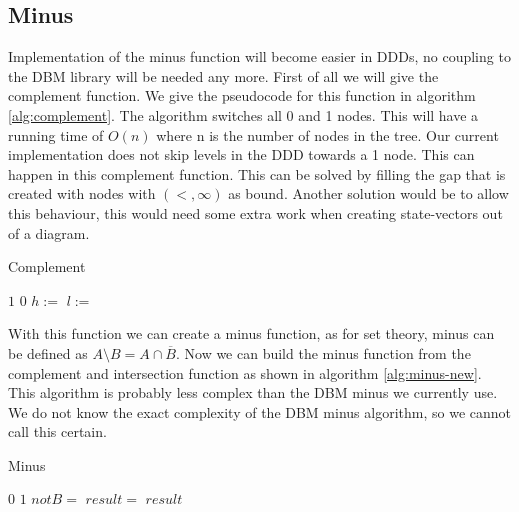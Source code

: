 \subsection{Minus}
Implementation of the minus function will become easier in DDDs, no coupling to the DBM library will be needed any more. First of all we will give the complement function. We give the pseudocode for this function in algorithm \ref{alg:complement}. The algorithm switches all 0 and 1 nodes. This will have a running time of $O(n)$ where n is the number of nodes in the tree. Our current implementation does not skip levels in the DDD towards a 1 node. This can happen in this complement function. This can be solved by filling the gap that is created with nodes with $(<,\infty)$ as bound. Another solution would be to allow this behaviour, this would need some extra work when creating state-vectors out of a diagram.

\begin{algorithm}
\caption{Complement}\label{alg:complement}
\begin{algorithmic}[1]
		\State \Return $1$
	\EndIf
		\State \Return $0$
	\EndIf
	\State $h :=$ 
	\State $l :=$ 
	\State \Return {}
	
\EndProcedure	
\end{algorithmic}
\end{algorithm}

With this function we can create a minus function, as for set theory, minus can be defined as $A \setminus B = A \cap \overline{B}$. Now we can build the minus function from the complement and intersection function as shown in algorithm \ref{alg:minus-new}. This algorithm is probably less complex than the DBM minus we currently use. We do not know the exact complexity of the DBM minus algorithm, so we cannot call this certain. 

\begin{algorithm}
\caption{Minus}\label{alg:minus-new}
\begin{algorithmic}[1]
		\State \Return $0$
	\EndIf
		\State \Return $1$
	\EndIf
	\State $notB = $
	\State $result =$ 
	\State \Return $result$
	
\EndProcedure	
\end{algorithmic}
\end{algorithm}
